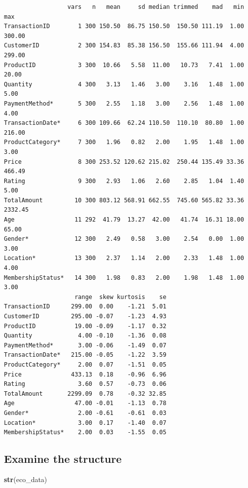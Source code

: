 \documentclass[
]{article}
\newenvironment{Shaded}{\begin{snugshade}}{\end{snugshade}}
\newcommand{\FunctionTok}[1]{\textcolor[rgb]{0.13,0.29,0.53}{\textbf{#1}}}
\newcommand{\NormalTok}[1]{#1}
\begin{document}
\begin{verbatim}
                  vars   n   mean     sd median trimmed    mad   min     max
TransactionID        1 300 150.50  86.75 150.50  150.50 111.19  1.00  300.00
CustomerID           2 300 154.83  85.38 156.50  155.66 111.94  4.00  299.00
ProductID            3 300  10.66   5.58  11.00   10.73   7.41  1.00   20.00
Quantity             4 300   3.13   1.46   3.00    3.16   1.48  1.00    5.00
PaymentMethod*       5 300   2.55   1.18   3.00    2.56   1.48  1.00    4.00
TransactionDate*     6 300 109.66  62.24 110.50  110.10  80.80  1.00  216.00
ProductCategory*     7 300   1.96   0.82   2.00    1.95   1.48  1.00    3.00
Price                8 300 253.52 120.62 215.02  250.44 135.49 33.36  466.49
Rating               9 300   2.93   1.06   2.60    2.85   1.04  1.40    5.00
TotalAmount         10 300 803.12 568.91 662.55  745.60 565.82 33.36 2332.45
Age                 11 292  41.79  13.27  42.00   41.74  16.31 18.00   65.00
Gender*             12 300   2.49   0.58   3.00    2.54   0.00  1.00    3.00
Location*           13 300   2.37   1.14   2.00    2.33   1.48  1.00    4.00
MembershipStatus*   14 300   1.98   0.83   2.00    1.98   1.48  1.00    3.00
                    range  skew kurtosis    se
TransactionID      299.00  0.00    -1.21  5.01
CustomerID         295.00 -0.07    -1.23  4.93
ProductID           19.00 -0.09    -1.17  0.32
Quantity             4.00 -0.10    -1.36  0.08
PaymentMethod*       3.00 -0.06    -1.49  0.07
TransactionDate*   215.00 -0.05    -1.22  3.59
ProductCategory*     2.00  0.07    -1.51  0.05
Price              433.13  0.18    -0.96  6.96
Rating               3.60  0.57    -0.73  0.06
TotalAmount       2299.09  0.78    -0.32 32.85
Age                 47.00 -0.01    -1.13  0.78
Gender*              2.00 -0.61    -0.61  0.03
Location*            3.00  0.17    -1.40  0.07
MembershipStatus*    2.00  0.03    -1.55  0.05
\end{verbatim}

\subsection{Examine the structure}\label{examine-the-structure}

\begin{Shaded}
\begin{Highlighting}[]
\FunctionTok{str}\NormalTok{(eco\_data)}
\end{Highlighting}
\end{Shaded}
\end{document}

